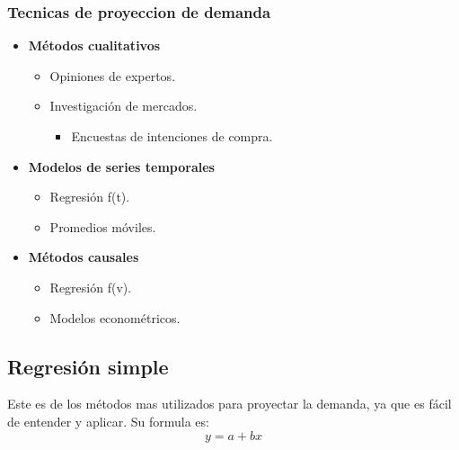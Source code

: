 \documentclass{templateNote}
\begin{document}
\subsubsection{Tecnicas de proyeccion de demanda}
\vspace{0.5cm}
\begin{center}
    \begin{minipage}[H]{0.45\textwidth}
        \begin{itemize}
            \item \textbf{Métodos cualitativos} 
            \begin{itemize}
                \item Opiniones de expertos.
                \item Investigación de mercados.
                \begin{itemize}
                    \item Encuestas de intenciones de compra.
                \end{itemize}
            \end{itemize}
        \end{itemize}
    \end{minipage}
    \begin{minipage}[H]{0.45\textwidth}
        \begin{itemize}
            \item \textbf{Modelos de series temporales}
            \begin{itemize}
                \item Regresión f(t).
                \item Promedios móviles.
            \end{itemize}
            \item \textbf{Métodos causales}
            \begin{itemize}
                \item Regresión f(v).
                \item Modelos econométricos.
            \end{itemize} 
        \end{itemize}
    \end{minipage}
\end{center}

\subsection{Regresión simple}
Este es de los métodos mas utilizados para proyectar la demanda, ya que es fácil de entender y aplicar. Su formula es:
\begin{equation*}
    y = a + bx
\end{equation*}
\end{document}
